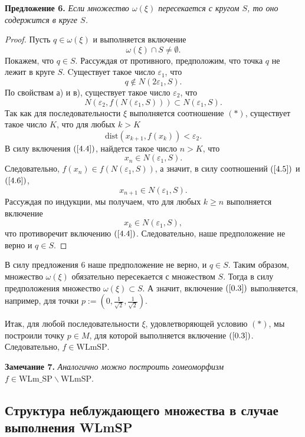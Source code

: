 \documentclass[12pt]{article}
\begin{document}
\textbf{Предложение 6.} 
\textit{Если множество $\omega(\xi)$ пересекается с кругом $S$, то оно содержится в круге $S$.}
\begin{proof}
Пусть $q\in\omega(\xi)$ и выполняется включение
\begin{equation}
\label{4.4}
\omega(\xi)\cap S\neq\emptyset.
\end{equation}
Покажем, что $q\in S$.
Рассуждая от противного, предположим, что точка $q$ не лежит в круге $S$.  
Cуществует такое число $\varepsilon_1$, что 
$$q\notin N(2\varepsilon_1,S).$$
 По свойствам а) и в), существует такое число $\varepsilon_2$, что 
 \begin{equation}
 \label{4.5}
 N\left(\varepsilon_2,f(N(\varepsilon_1,S))\right)\subset N(\varepsilon_1,S). 
 \end{equation}
 Так как для последовательности $\xi$ выполняется соотношение $(*)$, сущес\-твует такое число $K$, что для любых $k>K$ 
\begin{equation}
\label{4.6}
\textrm{dist}(x_{k+1},f(x_k))<\varepsilon_2.
\end{equation}
 В силу включения $(\ref{4.4})$, найдется такое число $n>K$, что
$$x_n\in N(\varepsilon_1,S).$$
Следовательно, $f(x_{n})\in f(N(\varepsilon_1,S))$, а значит, в силу соотношений $(\ref{4.5})$ и $(\ref{4.6})$, 
$$x_{n+1}\in N(\varepsilon_1,S).$$ 
Рассуждая по индукции, мы получаем, что для любых $k\geq n$ выполняется включение 
$$x_k\in N(\varepsilon_1,S),$$ что противоречит включению $(\ref{4.4})$. Следовательно, наше предположение не верно и $q\in S$.
\end{proof}

В силу предложения 6 наше предположение не верно, и $q\in S$. Таким образом, множество $\omega(\xi)$ обязательно пересекается с множеством $S$. Тогда в силу предположения множество $\omega(\xi)\subset S$.    
А значит, включение $(\ref{0.3})$ выполняется, например, для точки $p:=\left(0,\frac{1}{\sqrt{2}},\frac{1}{\sqrt{2}}\right)$.
 
 Итак, для любой последовательности $\xi$, удовлетворяющей условию $(*)$, мы построили точку $p\!\in\! M$, для которой выполняется включение $(\ref{0.3})$. Следовательно, $f\!\in\!\textrm{WLmSP}$.
 
 \textbf{Замечание 7.}\textit{ Аналогично можно построить гомеоморфизм}
 $f\!\in\!\textrm{WLm\_SP}\allowbreak\backslash \textrm{WLmSP}$.

 \subsection{Структура неблуждающего множества в случае выполнения WLmSP}
 
\end{document}
